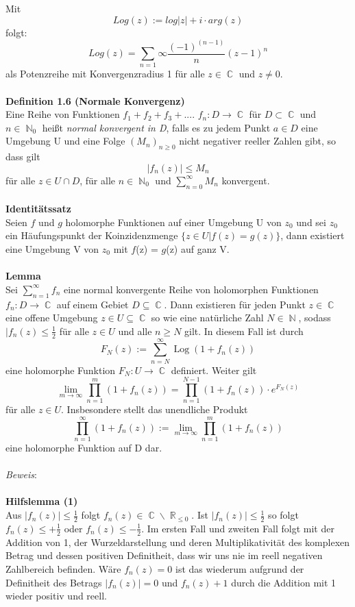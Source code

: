 \documentclass[10pt,a4paper]{article}
\DeclareMathOperator{\R}{\mathbb{R}}
\DeclareMathOperator{\C}{\mathbb{C}}
\DeclareMathOperator{\N}{\mathbb{N}}
\DeclareMathOperator{\Log}{Log}
\begin{document}
Mit $$Log(z) := log|z|+ i \cdot arg(z)$$ folgt: $$Log(z) = \sum_{n = 1}{\infty}\frac{(-1)^{(n-1)}}{n}(z-1)^{n}$$ als Potenzreihe mit Konvergenzradius 1 für alle $z \in \C$ und $z \neq 0$.
\\
\\
\textbf{Definition 1.6 (Normale Konvergenz)}
\\

Eine Reihe von Funktionen $f_{1}+f_{2}+f_{3}+....$ $f_{n}: D\rightarrow \C $ für $D \subset \C$ und $n \in \N_{0}$ heißt \textit{normal konvergent in D}, falls es zu jedem Punkt $a \in D$ eine Umgebung U und eine Folge $(M_{n})_{n\geq0}$ nicht negativer reeller Zahlen gibt, so dass gilt $$|f_{n}(z)|\leq M_{n}$$ für alle $z \in U \cap D$, für alle $n \in \N_{0}$ und $\sum_{n = 0}^{\infty}M_{n}$ konvergent.
\\
\\
\textbf{Identitätssatz}
\\

Seien $f$ und $g$ holomorphe Funktionen auf einer Umgebung U von $z_{0}$ und sei $z_{0}$ ein Häufungspunkt der Koinzidenzmenge  $\{ z \in U  |  f(z) = g(z) \}$, dann existiert eine Umgebung V von $z_{0}$ mit $f$(z) = $g$(z) auf ganz V.
\\
\\
\textbf{Lemma}
\\

Sei $\sum_{n =1}^\infty f_{\textit{n}}$ eine normal konvergente Reihe von holomorphen Funktionen $f_{\textit{n}}: \textit{D}\rightarrow\C $ auf einem Gebiet
$D\subseteq\C$. Dann existieren für jeden Punkt $ z \in \C$ eine offene Umgebung $z \in U \subseteq \C$ so wie eine natürliche Zahl $N \in \N$, sodass $|f_{\textit{n}}(z) \leq \frac{1}{2}$ für alle $z \in U $ und alle $n \geq N $ gilt. In diesem Fall ist durch $$F_{N}(z) := \sum_{n = N}^\infty \Log( 1 + f_{n}(z))$$ eine holomorphe Funktion $F_{N} : U \rightarrow \C$ definiert. Weiter gilt $$\lim_{m\rightarrow\infty}\prod_{n=1}^m ( 1 + f_{n}(z)) = \prod_{n=1}^{N-1} ( 1 + f_{n}(z))\cdot e^{F_{N}(z)}$$ für alle $z \in U$. Insbesondere stellt das unendliche Produkt$$\prod_{n=1}^\infty ( 1 + f_{n}(z)) := \lim_{m\rightarrow\infty}\prod_{n=1}^m ( 1 + f_{n}(z))$$ eine holomorphe Funktion auf D dar.
\\
\\
\textit{Beweis}:
\\
\\
\textbf{Hilfslemma (1)}
\\
Aus $|f_n(z)|\leq \frac{1}{2}$ folgt $f_n(z) \in \C\backslash\R_{\leq 0}$. Ist $|f_n(z)|\leq \frac{1}{2}$ so folgt $f_n(z)\leq +\frac{1}{2}$ oder $f_n(z)\leq -\frac{1}{2}$. Im ersten Fall und zweiten Fall folgt mit der Addition von 1, der Wurzeldarstellung und deren Multiplikativität des komplexen Betrag und dessen positiven Definitheit, dass wir uns nie im reell negativen Zahlbereich befinden. Wäre $f_n(z)=0$ ist das wiederum aufgrund der Definitheit des Betrags $|f_n(z)|=0$ und $f_n(z)+1$ durch die Addition mit 1 wieder positiv und reell.
\end{document}
